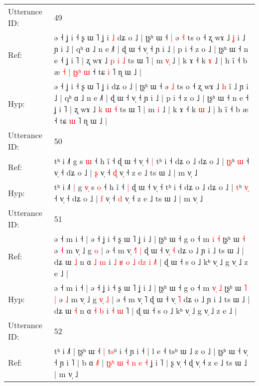 \documentclass[10pt]{article}
\DeclareRobustCommand{\hl}[1]{{\textcolor{red}{#1}}}
\begin{document}
\begin{longtable}{ll}
 \\
\midrule
Utterance ID: & 49 \\
Ref: & ə ˧ ʝ i ˧ ʂ ɯ ˥ ʝ i\hl{ }\hl{˩} dʑ o ˩ | ʈʂʰ ɯ ˧\hl{ }\hl{|} ə \hl{˧} ts o ˧ ʐ wɤ ˩ \hl{ʝ} i\hl{} ˩ ɲ i ˩ | qʰ ɑ ˩ n e ˩˥ | ɖ ɯ ˧ v̩ ˧ ɲ i ˩ | p i ˧ z o ˩ | ʈʂʰ ɯ ˧ n e ˧ ʝ i ˥ | ʐ wɤ ˩ \hl{p} \hl{i} \hl{˩} ts ɯ ˥ | m \hl{v}\hl{̩} ˩ | k ɤ ˧ k \hl{ɤ} ˩ | h ĩ ˧ b æ\hl{ }\hl{˧}\hl{ }\hl{|}\hl{ }\hl{ʈ}\hl{ʂ}\hl{ʰ}\hl{ }\hl{ɯ} ˧ tɕ \hl{i} ˥ ɳ ɯ ˩ |
 \\
Hyp: & ə ˧ ʝ i ˧ ʂ ɯ ˥ ʝ i\hl{}\hl{} dʑ o ˩ | ʈʂʰ ɯ ˧\hl{}\hl{} ə \hl{˩} ts o ˧ ʐ wɤ ˩ \hl{h} i\hl{̃} ˩ ɲ i ˩ | qʰ ɑ ˩ n e ˩˥ | ɖ ɯ ˧ v̩ ˧ ɲ i ˩ | p i ˧ z o ˩ | ʈʂʰ ɯ ˧ n e ˧ ʝ i ˥ | ʐ wɤ ˩ \hl{k} \hl{ɯ} \hl{˧} ts ɯ ˥ | m \hl{}\hl{i} ˩ | k ɤ ˧ k \hl{ɯ} ˩ | h ĩ ˧ b æ\hl{}\hl{}\hl{}\hl{}\hl{}\hl{}\hl{}\hl{}\hl{}\hl{} ˧ tɕ \hl{ɯ} ˥ ɳ ɯ ˩ |
 \\
\midrule
Utterance ID: & 50 \\
Ref: & tʰ i ˩˥\hl{}\hl{} g\hl{}\hl{}\hl{} s \hl{ɯ} ˧ h ĩ ˧\hl{}\hl{} ɖ ɯ ˧ v̩ ˧\hl{ }\hl{|} tʰ i ˧ dʑ o ˩ dʑ o ˩ | \hl{ʈ}\hl{ʂ}ʰ \hl{}\hl{ɯ} ˧ v̩ ˧ dʑ o ˩ | \hl{ʂ} v̩ ˧ \hl{ɖ} v̩ ˧ z e ˩ ts ɯ ˩ | m v̩ ˩
 \\
Hyp: & tʰ i ˩˥\hl{ }\hl{|} g\hl{ }\hl{v}\hl{̩} s \hl{o} ˧ h ĩ ˧\hl{ }\hl{|} ɖ ɯ ˧ v̩ ˧\hl{}\hl{} tʰ i ˧ dʑ o ˩ dʑ o ˩ | \hl{}\hl{t}ʰ \hl{v}\hl{̩} ˧ v̩ ˧ dʑ o ˩ | \hl{f} v̩ ˧ \hl{d} v̩ ˧ z e ˩ ts ɯ ˩ | m v̩ ˩
 \\
\midrule
Utterance ID: & 51 \\
Ref: & ə ˧ m i ˧ | ə ˧ ʝ i ˧ ʂ ɯ ˥ ʝ i ˩ | ʈʂʰ ɯ ˧ g o ˧ m \hl{}\hl{i} \hl{˧} ʈʂʰ ɯ\hl{}\hl{} \hl{˧} ə \hl{˧} m v̩ ˩ g\hl{}\hl{}\hl{} \hl{o} | ə ˧ m v̩ \hl{˧}˥\hl{ }\hl{|} ɖ ɯ ˧ v̩ \hl{˧} dʑ o ˩ ɲ i ˩ ts ɯ ˩ | dʑ ɯ \hl{˩} n ɑ \hl{˩} \hl{m} i\hl{ }\hl{˩}\hl{ }\hl{ʁ}\hl{ }\hl{o}\hl{ }\hl{˩} \hl{d}\hl{z} \hl{i} \hl{˩}˥ | ɖ ɯ ˧ s o ˩ kʰ v̩ ˩ g v̩ ˩ z e ˩ |
 \\
Hyp: & ə ˧ m i ˧ | ə ˧ ʝ i ˧ ʂ ɯ ˥ ʝ i ˩ | ʈʂʰ ɯ ˧ g o ˧ m \hl{v}\hl{̩} \hl{˩} ʈʂʰ ɯ\hl{ }\hl{˥} \hl{|} ə \hl{˩} m v̩ ˩ g\hl{ }\hl{v}\hl{̩} \hl{˩} | ə ˧ m v̩ \hl{}˥\hl{}\hl{} ɖ ɯ ˧ v̩ \hl{˥} dʑ o ˩ ɲ i ˩ ts ɯ ˩ | dʑ ɯ \hl{˧} n ɑ \hl{˧} \hl{b} i\hl{}\hl{}\hl{}\hl{}\hl{}\hl{}\hl{}\hl{} \hl{}\hl{˧} \hl{ɯ} \hl{}˥ | ɖ ɯ ˧ s o ˩ kʰ v̩ ˩ g v̩ ˩ z e ˩ |
 \\
\midrule
Utterance ID: & 52 \\
Ref: & tʰ i ˩˥ | ʈʂʰ ɯ ˧\hl{ }\hl{|} t\hl{s}ʰ i ˧ ɲ i ˧ | l e ˧ tsʰ ɯ ˩ z o ˩ | ʈʂʰ ɯ ˧ v̩ ˧ ɲ i ˥ | b ɑ \hl{˩}˥ |\hl{}\hl{} \hl{ʈ}\hl{ʂ}\hl{ʰ} \hl{ɯ} \hl{}\hl{}\hl{˧} \hl{n} \hl{e} \hl{˧} ʝ i ˥ | ʂ v̩ ˧ ɖ v̩ ˧ z e ˩ ts ɯ ˩ | m v̩ ˩\hl{}\hl{}

\end{longtable}
\end{document}
